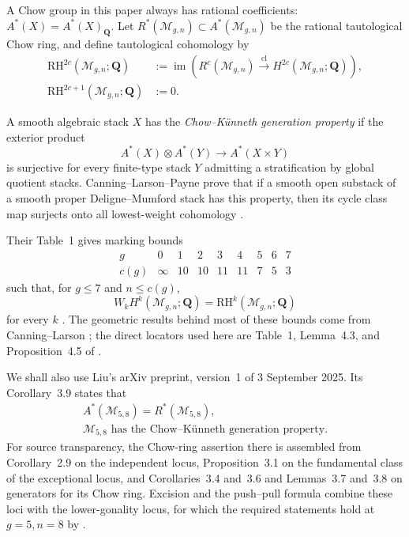 \documentclass[12pt,reqno]{amsart}
\newcommand{\Q}{\mathbf{Q}}
\newcommand{\M}{\mathcal{M}}
\newcommand{\RH}{\mathrm{RH}}
\newcommand{\im}{\operatorname{im}}
\theoremstyle{definition}
\theoremstyle{remark}
\begin{document}
A Chow group in this paper always has rational coefficients:
$A^*(X)=A^*(X)_{\Q}$.  Let $R^*(\M_{g,n})\subset A^*(\M_{g,n})$ be the
rational tautological Chow ring, and define tautological cohomology by
\begin{equation}\label{eq:RH-definition}
 \begin{aligned}
 \RH^{2c}(\M_{g,n};\Q)
 &:=\im\!\left(R^c(\M_{g,n})\xrightarrow{\mathrm{cl}}
 H^{2c}(\M_{g,n};\Q)\right),\\
 \RH^{2c+1}(\M_{g,n};\Q)&:=0.
 \end{aligned}
\end{equation}

A smooth algebraic stack $X$ has the \emph{Chow--K\"unneth generation
property} if the exterior product
\[
 A^*(X)\otimes A^*(Y)\longrightarrow A^*(X\times Y)
\]
is surjective for every finite-type stack $Y$ admitting a stratification by
global quotient stacks.  Canning--Larson--Payne prove that if a smooth open
substack of a smooth proper Deligne--Mumford stack has this property, then
its cycle class map surjects onto all lowest-weight cohomology
\cite[Lemma~4.3]{CLP}.

Their Table~1 gives marking bounds
\begin{equation}\label{eq:c-table}
\begin{array}{c|cccccccc}
g&0&1&2&3&4&5&6&7\\ \hline
c(g)&\infty&10&10&11&11&7&5&3
\end{array}
\end{equation}
such that, for $g\leq7$ and $n\leq c(g)$,
\begin{equation}\label{eq:CLP-pure-taut}
 W_kH^k(\M_{g,n};\Q)=\RH^k(\M_{g,n};\Q)
\end{equation}
for every $k$ \cite[Proposition~4.5]{CLP}.  The geometric results behind most
of these bounds come from Canning--Larson \cite{CanningLarsonStable}; the
direct locators used here are Table~1, Lemma~4.3, and Proposition~4.5 of
\cite{CLP}.

We shall also use Liu's arXiv preprint, version~1 of 3 September 2025.
Its Corollary~3.9 states that
\begin{equation}\label{eq:liu-theorem}
 \begin{gathered}
 A^*(\M_{5,8})=R^*(\M_{5,8}),\\
 \M_{5,8}\text{ has the Chow--K\"unneth generation property}.
 \end{gathered}
\end{equation}
For source transparency, the Chow-ring assertion there is assembled from
Corollary~2.9 on the independent locus, Proposition~3.1 on the fundamental
class of the exceptional locus, and Corollaries~3.4 and~3.6 and
Lemmas~3.7 and~3.8 on generators for its Chow ring.  Excision and the
push--pull formula combine these loci with the lower-gonality locus, for
which the required statements hold at $g=5,n=8$ by
\cite[Lemma~9.9]{CanningLarsonStable}.
\end{document}
